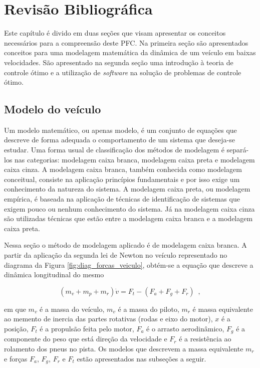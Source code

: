 \chapter[Revisão Bibliográfica]{Revisão Bibliográfica}
\label{chap:revisao}
\thispagestyle{empty}

Este capítulo é divido em duas seções que visam apresentar os conceitos necessários para a compreensão deste PFC.
Na primeira seção são apresentados conceitos para uma modelagem matemática da dinâmica de um veículo em baixas velocidades.
São apresentado na segunda seção uma introdução à teoria de controle ótimo e a utilização de \textit{software} na solução
de problemas de controle ótimo.

\section{Modelo do veículo}
\label{sec:modelo}

Um modelo matemático, ou apenas modelo, é um conjunto de equações que descreve de forma adequada o comportamento de um sistema que deseja-se estudar.
Uma forma usual de classificação dos métodos de modelagem é separá-los nas categorias: modelagem caixa branca, modelagem caixa preta e modelagem
caixa cinza.
A modelagem caixa branca, também conhecida como modelagem conceitual, consiste na aplicação princípios fundamentais e por isso exige um conhecimento
da natureza do sistema.
A modelagem caixa preta, ou modelagem empírica, é baseada na aplicação de técnicas de identificação de sistemas que exigem pouco ou
nenhum conhecimento do sistema.
Já na modelagem caixa cinza são utilizadas técnicas que estão entre a modelagem caixa branca e a modelagem caixa preta\cite{book:Aguirre}.

Nessa seção o método de modelagem aplicado é de modelagem caixa branca. A partir da aplicação da segunda lei de Newton no
veículo representado no diagrama da Figura \ref{fig:diag_forcas_veiculo}, obtém-se a equação que descreve a dinâmica longitudinal do mesmo

\begin{equation}
	\label{eq:SomaForcas}
	(m_v + m_p + m_r) \dot v = F_t - (F_a + F_g + F_r)
	\enspace,
\end{equation}

em que $m_v$ é a massa do veículo, $m_v$ é a massa do piloto,  $m_r$ é massa equivalente ao memento de inercia das partes rotativas (rodas e eixo do motor),  $x$ é a posição, $F_{t}$ é a propulsão feita pelo motor, $F_{a}$ é o
arrasto aerodinâmico, $F_g$ é a componente do peso que está direção da velocidade e $F_{r}$ é a resistência ao rolamento dos pneus no pista.
Os modelos que descrevem a massa equivalente $m_r$ e forças $F_{a}$, $F_g$, $F_{r}$ e $F_{t}$ estão apresentados nas subseções a seguir.

